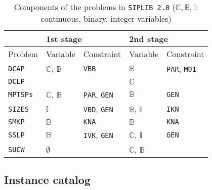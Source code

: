 \begin{table}[H]
	\centering
	\caption{Components of the problems in \texttt{SIPLIB 2.0} ($\mathbb{C},\mathbb{B},\mathbb{I}$: continuous, binary, integer variables)}
	\label{table:prob_class}
	\begin{tabular}{@{}lllll@{}}
		\toprule
		& \multicolumn{2}{l}{1st stage}                              				  	& \multicolumn{2}{l}{2nd stage}                             			        \\ \midrule
		Problem 	     & Variable                    & Constraint                   	& Variable                    & Constraint                  				    \\ \midrule
		\texttt{DCAP}    & $\mathbb{C}$, $\mathbb{B}$  & \texttt{VBB}                	& $\mathbb{B}$                & \texttt{PAR}, \texttt{M01} 			    		\\
		\texttt{DCLP}	 &							   &								& $\mathbb{C}$			 	  &													\\				
		\texttt{MPTSPs}  & $\mathbb{C}$, $\mathbb{B}$  & \texttt{PAR}, \texttt{GEN}		& $\mathbb{B}$                & \texttt{GEN}               						\\
		\texttt{SIZES}   & $\mathbb{I}$ 			   & \texttt{VBD}, \texttt{GEN} 	& $\mathbb{B}$, $\mathbb{I}$  & \texttt{IKN}             						\\
		\texttt{SMKP}    & $\mathbb{B}$                & \texttt{KNA}                	& $\mathbb{B}$                & \texttt{KNA}              						\\
		\texttt{SSLP}    & $\mathbb{B}$                & \texttt{IVK}, \texttt{GEN} 	& $\mathbb{C}$, $\mathbb{I}$  & \texttt{GEN}             						\\
		\texttt{SUCW}    & $\emptyset$                 &                              	& $\mathbb{C}$, $\mathbb{B}$  &                             					\\ \bottomrule
	\end{tabular}
\end{table}



\subsection{Instance catalog}

